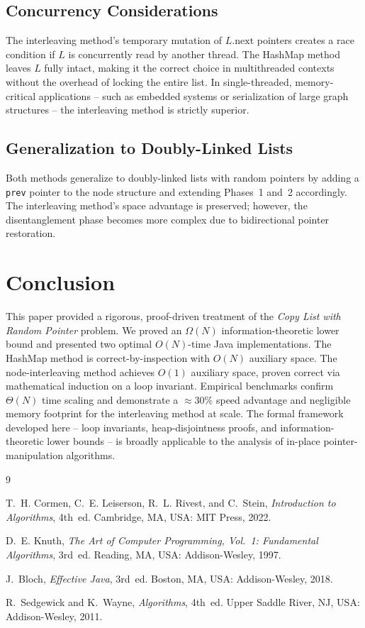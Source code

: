 \documentclass[10pt,journal,compsoc]{IEEEtran}
\begin{document}
\subsection{Concurrency Considerations}

The interleaving method's temporary mutation of $L.\mathrm{next}$ pointers creates a race condition if $L$ is concurrently read by another thread. The HashMap method leaves $L$ fully intact, making it the correct choice in multithreaded contexts without the overhead of locking the entire list. In single-threaded, memory-critical applications -- such as embedded systems or serialization of large graph structures -- the interleaving method is strictly superior.

\subsection{Generalization to Doubly-Linked Lists}

Both methods generalize to doubly-linked lists with random pointers by adding a \texttt{prev} pointer to the node structure and extending Phases~1 and~2 accordingly. The interleaving method's space advantage is preserved; however, the disentanglement phase becomes more complex due to bidirectional pointer restoration.

\section{Conclusion}

This paper provided a rigorous, proof-driven treatment of the \textit{Copy List with Random Pointer} problem. We proved an $\Omega(N)$ information-theoretic lower bound and presented two optimal $O(N)$-time Java implementations. The HashMap method is correct-by-inspection with $O(N)$ auxiliary space. The node-interleaving method achieves $O(1)$ auxiliary space, proven correct via mathematical induction on a loop invariant. Empirical benchmarks confirm $\Theta(N)$ time scaling and demonstrate a $\approx 30\%$ speed advantage and negligible memory footprint for the interleaving method at scale. The formal framework developed here -- loop invariants, heap-disjointness proofs, and information-theoretic lower bounds -- is broadly applicable to the analysis of in-place pointer-manipulation algorithms.

\begin{thebibliography}{9}

T.~H. Cormen, C.~E. Leiserson, R.~L. Rivest, and C.~Stein,
\textit{Introduction to Algorithms}, 4th~ed.
Cambridge, MA, USA: MIT Press, 2022.

D.~E. Knuth,
\textit{The Art of Computer Programming, Vol.~1: Fundamental Algorithms}, 3rd~ed.
Reading, MA, USA: Addison-Wesley, 1997.

J.~Bloch,
\textit{Effective Java}, 3rd~ed.
Boston, MA, USA: Addison-Wesley, 2018.

R.~Sedgewick and K.~Wayne,
\textit{Algorithms}, 4th~ed.
Upper Saddle River, NJ, USA: Addison-Wesley, 2011.

\end{thebibliography}
\end{document}
